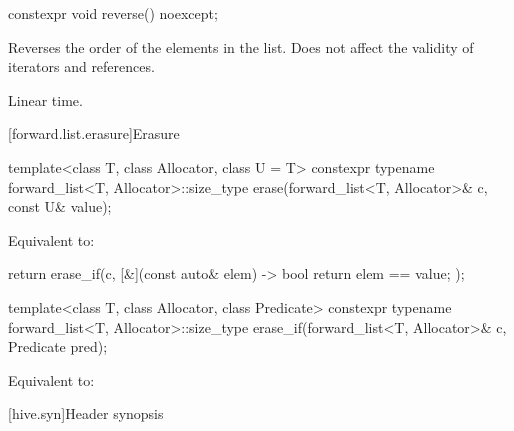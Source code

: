 %
\begin{itemdecl}
constexpr void reverse() noexcept;
\end{itemdecl}

\begin{itemdescr}
\pnum
\effects
Reverses the order of the elements in the list.
Does not affect the validity of iterators and references.

\pnum
\complexity
Linear time.
\end{itemdescr}

[forward.list.erasure]{Erasure}

%
\begin{itemdecl}
template<class T, class Allocator, class U = T>
  constexpr typename forward_list<T, Allocator>::size_type
    erase(forward_list<T, Allocator>& c, const U& value);
\end{itemdecl}

\begin{itemdescr}
\pnum
\effects
Equivalent to:
\begin{codeblock}
return erase_if(c, [&](const auto& elem) -> bool { return elem == value; });
\end{codeblock}
\end{itemdescr}

%
\begin{itemdecl}
template<class T, class Allocator, class Predicate>
  constexpr typename forward_list<T, Allocator>::size_type
    erase_if(forward_list<T, Allocator>& c, Predicate pred);
\end{itemdecl}

\begin{itemdescr}
\pnum
\effects
Equivalent to: 
\end{itemdescr}

[hive.syn]{Header  synopsis}

